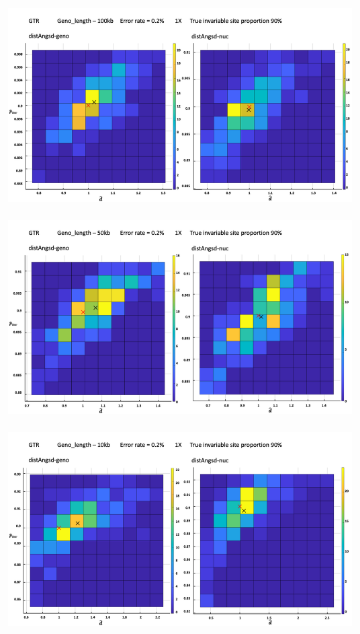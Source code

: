 \documentclass{article}
\begin{document}
\begin{figure}
\begin{subfigure}{.5\textwidth}
  \caption{}
  \label{fig:2D90s3}
\end{subfigure}
\begin{subfigure}{.5\textwidth}
  \centering
  \includegraphics[width=.99\linewidth]{100k90.png}  
  \caption{}
  \label{fig:2D90s4}
\end{subfigure}
\newline
\begin{subfigure}{.5\textwidth}
  \centering
  \includegraphics[width=.99\linewidth]{50k90.png}  
  \caption{}
  \label{fig:2D90s5}
\end{subfigure}
\begin{subfigure}{.5\textwidth}
  \centering
  \includegraphics[width=.99\linewidth]{10k90.png}  

\end{subfigure}
\end{figure}
\end{document}
